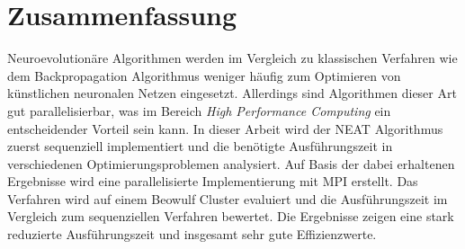 \section*{Zusammenfassung}
Neuroevolutionäre Algorithmen werden im Vergleich zu klassischen Verfahren wie dem Backpropagation Algorithmus weniger häufig zum Optimieren von künstlichen neuronalen Netzen eingesetzt. Allerdings sind Algorithmen dieser Art gut parallelisierbar, was im Bereich \emph{High Performance Computing} ein entscheidender Vorteil sein kann. In dieser Arbeit wird der \acs*{NEAT} Algorithmus zuerst sequenziell implementiert und die benötigte Ausführungszeit in verschiedenen Optimierungsproblemen analysiert. Auf Basis der dabei erhaltenen Ergebnisse wird eine parallelisierte Implementierung mit \acs*{MPI} erstellt. Das Verfahren wird auf einem Beowulf Cluster evaluiert und die Ausführungszeit im Vergleich zum sequenziellen Verfahren bewertet. Die Ergebnisse zeigen eine stark reduzierte Ausführungszeit und insgesamt sehr gute Effizienzwerte.

